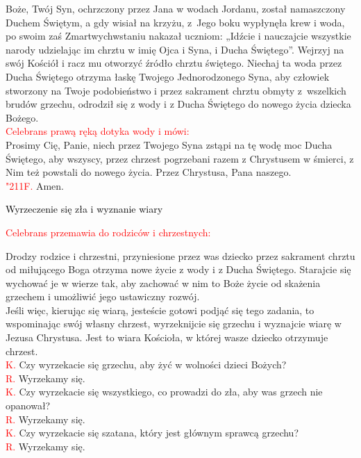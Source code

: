 \documentclass[10pt, a5paper]{extarticle}
\newcommand{\textjuni}[1]{{\fontspec{Junicode}#1}}
\newcommand{\response}{\textcolor{red}{\textjuni{\char"211F. }}}
\begin{document}
\begin{Parallel}[v]{0.485\textwidth}{0.485\textwidth}
{Boże, Twój Syn, ochrzczony
przez Jana w wodach Jordanu,
został namaszczony Duchem Świętym,
a gdy wisiał na krzyżu, z~Jego boku wypłynęła krew i woda,
po swoim zaś Zmartwychwstaniu nakazał uczniom:
„Idźcie i nauczajcie wszystkie narody
udzielając im chrztu w imię Ojca i Syna, i Ducha Świętego”.
Wejrzyj na swój Kościół
i racz mu otworzyć źródło chrztu świętego.
Niechaj ta woda przez Ducha Świętego otrzyma łaskę
Twojego Jednorodzonego Syna,
aby człowiek stworzony na Twoje podobieństwo
i przez sakrament chrztu obmyty z~wszelkich brudów grzechu,
odrodził się z wody i z Ducha Świętego
do nowego życia dziecka Bożego. \\
\textcolor{red}{Celebrans prawą ręką dotyka wody i mówi:} \\
Prosimy Cię, Panie, niech przez Twojego Syna
zstąpi na tę wodę moc Ducha Świętego,
aby wszyscy, przez chrzest pogrzebani
razem z Chrystusem w śmierci,
z Nim też powstali do nowego życia.
Przez Chrystusa, Pana naszego. \\
\response Amen.
}
\end{Parallel}


\begin{center}
\Large
\noindent\textcolor{black}{Wyrzeczenie się zła i wyznanie wiary}
\end{center}

\textcolor{red}{Celebrans przemawia do rodziców i chrzestnych:}

Drodzy rodzice i chrzestni, przyniesione przez was dziecko przez sakrament chrztu od miłującego Boga otrzyma nowe życie z wody i z Ducha Świętego. Starajcie się wychować je w wierze tak, aby zachować w nim to Boże życie od skażenia grzechem i umożliwić jego ustawiczny rozwój. \\
Jeśli więc, kierując się wiarą, jesteście gotowi podjąć się tego zadania, to wspominając swój własny chrzest, wyrzeknijcie się grzechu i wyznajcie wiarę w Jezusa Chrystusa. Jest to wiara Kościoła, w której wasze dziecko otrzymuje chrzest.\\
\textcolor{red}{K.} Czy wyrzekacie się grzechu, aby żyć w wolności dzieci Bożych?  \\
\textcolor{red}{R.} Wyrzekamy się. \\
\textcolor{red}{K.} Czy wyrzekacie się wszystkiego, co prowadzi do zła, aby was grzech nie opanował?  \\
\textcolor{red}{R.} Wyrzekamy się. \\
\textcolor{red}{K.} Czy wyrzekacie się szatana, który jest głównym sprawcą grzechu?  \\
\textcolor{red}{R.} Wyrzekamy się. \\
\end{document}
